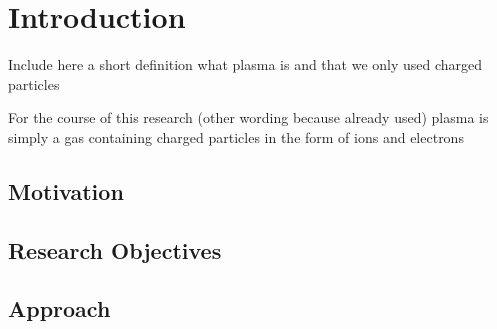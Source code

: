 \chapter{Introduction}

Include here a short definition what plasma is and that we only used charged particles 

For the course of this research (other wording because already used) plasma is simply a gas containing charged particles in the form of ions and electrons




\section{Motivation}

\section{Research Objectives}


\section{Approach}